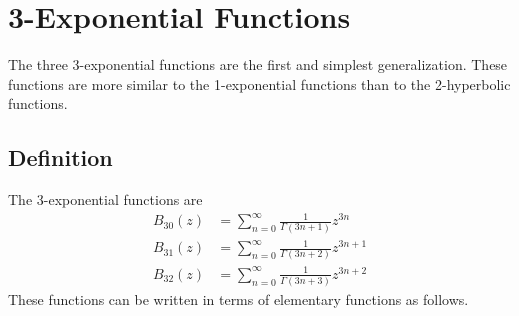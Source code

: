 \chapter{3-Exponential Functions}
The three 3-exponential functions are the first and simplest generalization. These functions are more similar to the 1-exponential functions than to the 2-hyperbolic functions.
\section{Definition}
The 3-exponential functions are
\begin{align}
    B_{30}(z) & = \sum_{n = 0}^{\infty} \frac{1}{\Gamma(3n + 1)} z^{3n} \\
	B_{31}(z) & = \sum_{n = 0}^{\infty} \frac{1}{\Gamma(3n + 2)} z^{3n+1} \\
	B_{32}(z) & = \sum_{n = 0}^{\infty} \frac{1}{\Gamma(3n + 3)} z^{3n+2}
\end{align}
These functions can be written in terms of elementary functions as follows.

